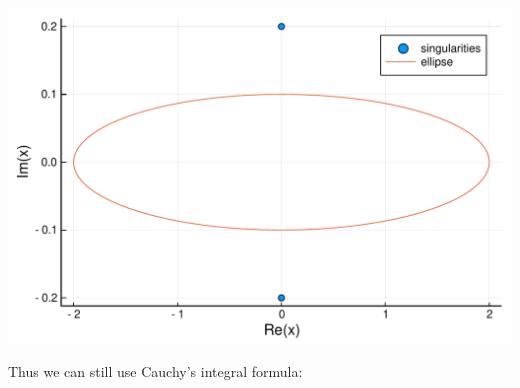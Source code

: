 \documentclass[12pt,a4paper]{article}
\begin{document}
\includegraphics[width=\linewidth]{figures/Lecture6_10_1.pdf}

Thus we can still use Cauchy's integral formula:
\end{document}
